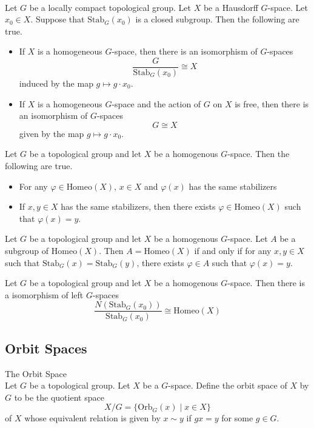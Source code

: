 \documentclass[a4paper]{article}
\begin{document}
\begin{prp}{}{}\\
Let $G$ be a locally compact topological group. Let $X$ be a Hausdorff $G$-space. Let $x_0\in X$. Suppose that $\text{Stab}_G(x_0)$ is a closed subgroup. Then the following are true. 
\begin{itemize}
\item If $X$ is a homogeneous $G$-space, then there is an isomorphism of $G$-spaces $$\frac{G}{\text{Stab}_G(x_0)}\cong X$$ induced by the map $g\mapsto g\cdot x_0$. 
\item If $X$ is a homogeneous $G$-space and the action of $G$ on $X$ is free, then there is an isomorphism of $G$-spaces $$G\cong X$$ given by the map $g\mapsto g\cdot x_0$. 
\end{itemize}
\end{prp}

\begin{prp}{}{} Let $G$ be a topological group and let $X$ be a homogenous $G$-space. Then the following are true. 
\begin{itemize}
\item For any $\varphi\in\text{Homeo}(X)$, $x\in X$ and $\varphi(x)$ has the same stabilizers
\item If $x,y\in X$ has the same stabilizers, then there exists $\varphi\in\text{Homeo}(X)$ such that $\varphi(x)=y$. 
\end{itemize}
\end{prp}

\begin{lmm}{}{} Let $G$ be a topological group and let $X$ be a homogenous $G$-space. Let $A$ be a subgroup of $\text{Homeo}(X)$. Then $A=\text{Homeo}(X)$ if and only if for any $x,y\in X$ such that $\text{Stab}_G(x)=\text{Stab}_G(y)$, there exists $\varphi\in A$ such that $\varphi(x)=y$. 
\end{lmm}

\begin{prp}{}{} Let $G$ be a topological group and let $X$ be a homogenous $G$-space. Then there is a isomorphism of left $G$-spaces $$\frac{N(\text{Stab}_G(x_0))}{\text{Stab}_G(x_0)}\cong\text{Homeo}(X)$$
\end{prp}

\subsection{Orbit Spaces}
\begin{defn}{The Orbit Space}{}\\
Let $G$ be a topological group. Let $X$ be a $G$-space. Define the orbit space of $X$ by $G$ to be the quotient space $$X/G=\{\text{Orb}_G(x)\;|\;x\in X\}$$ of $X$ whose equivalent relation is given by $x\sim y$ if $gx=y$ for some $g\in G$. 
\end{defn}
\end{document}
